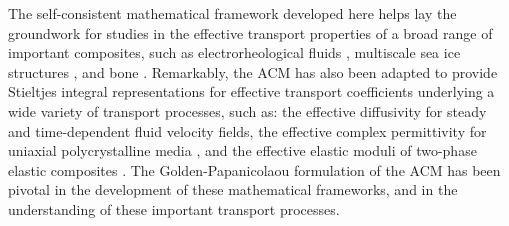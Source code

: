 \documentclass{cmslatex}
\renewcommand{\theequation}{\arabic{section}.\arabic{equation}}
\begin{document}
The self-consistent mathematical framework developed here helps lay
the groundwork for studies in the effective transport properties of a
broad range of important composites, such as electrorheological fluids
\cite{Murphy_Thermo_Stat_Mech}, multiscale sea ice structures
\cite{Murphy_Multiscale_Sea_Ice}, and bone
\cite{Golden:JBM:337}. Remarkably, the ACM  has also been adapted to
provide Stieltjes integral representations for  effective transport
coefficients underlying a wide variety of transport processes, such
as: the effective diffusivity for steady
\cite{McLaughlin:SIAM_JAM:780,Avellaneda:CMP-339,Murphy_Advective_Diffusion}
and time-dependent
\cite{Avellaneda:PRE:3249,Murphy_Advective_Diffusion_Dynamic}
fluid velocity fields, the effective complex permittivity for uniaxial
polycrystalline media
\cite{Barabash:JPCM:10323,Gully_Golden_Polycrystalline,Murphy_Polycrystalline_Media_ACM},
and the effective elastic moduli of two-phase elastic composites
\cite{Ou:2012:411,Ou:MMAS:655}. The Golden-Papanicolaou formulation of
the ACM has been pivotal in the development of these mathematical
frameworks, and in the understanding of these important transport
processes.  

  \setcounter{equation}{1}  %
  \setcounter{section}{0}  %
  \renewcommand{\theequation}{A-\arabic{equation}} 
\renewcommand{\thesection}{A-\arabic{section}}
\end{document}
